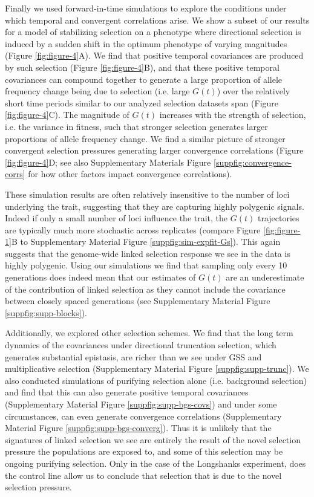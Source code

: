 \documentclass[11pt]{article}
\begin{document}
Finally we used forward-in-time simulations to explore the conditions under
which temporal and convergent correlations arise. We show a subset of our
results for a model of stabilizing selection on a phenotype where directional
selection is induced by a sudden shift in the optimum phenotype of varying
magnitudes (Figure \ref{fig:figure-4}A). We find that positive temporal
covariances are produced by such selection (Figure \ref{fig:figure-4}B), and
that these positive temporal covariances can compound together to generate a
large proportion of allele frequency change being due to selection (i.e. large
$G(t)$) over the relatively short time periods similar to our analyzed
selection datasets span (Figure \ref{fig:figure-4}C).  The magnitude of
$G(t)$ increases with the strength of selection, i.e. the variance in
fitness, such that stronger selection generates larger proportions of allele
frequency change.  We find a similar picture of stronger convergent selection
pressures generating larger convergence correlations (Figure
\ref{fig:figure-4}D; see also Supplementary Materials Figure
\ref{suppfig:convergence-corrs} for how other factors impact convergence
correlations). 

These simulation results are often relatively insensitive to the number of loci
underlying the trait, suggesting that they are capturing highly polygenic
signals.  Indeed if only a small number of loci influence the trait, the $G(t)$
trajectories are typically much more stochastic across replicates (compare
Figure \ref{fig:figure-1}B to Supplementary Material Figure
\ref{suppfig:sim-expfit-Gs}). This again suggests that the genome-wide linked
selection response we see in the \textcite{Barghi2019-qy} data is highly
polygenic.  Using our simulations we find that sampling only every 10
generations does indeed mean that our estimates of $G(t)$ are an underestimate
of the contribution of linked selection as they cannot include the covariance
between closely spaced generations (see Supplementary Material Figure
\ref{suppfig:supp-blocks}).

Additionally, we explored other selection schemes. We find that the long term
dynamics of the covariances under directional truncation selection, which
generates substantial epistasis, are richer than we see under GSS and
multiplicative selection (Supplementary Material Figure
\ref{suppfig:supp-trunc}).  We also conducted simulations of purifying
selection alone (i.e. background selection) and find that this can also
generate positive temporal covariances (Supplementary Material Figure
\ref{suppfig:supp-bgs-covs}) and under some circumstances, can even generate
convergence correlations (Supplementary Material Figure
\ref{suppfig:supp-bgs-converg}). Thus it is unlikely that the signatures of
linked selection we see are entirely the result of the novel selection pressure
the populations are exposed to, and some of this selection may be ongoing
purifying selection. Only in the case of the Longshanks experiment, does the
control line allow us to conclude that selection that is due to the novel
selection pressure.
\end{document}
